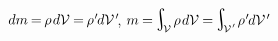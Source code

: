\vspace{-0.5em}\noindent
{}
${dm \hspace{-0.15ex} = \hspace{-0.2ex} \rho \hspace{.2ex} d\mathcal{V} \hspace{-0.1ex} = \hspace{-0.2ex} \rho\hspace{.1ex}' \hspace{-0.2ex} d\mathcal{V}\hspace{.2ex}'\hspace{-0.5ex}}$,
${m \hspace{-0.1ex} = \hspace{-0.2ex} \scalebox{1.4}{$\integral$}_{\hspace{-0.5ex}\raisemath{-0.05em}{\mathcal{V}}} \hspace{.3ex} \rho \hspace{.2ex} d\mathcal{V} \hspace{-0.1ex}
= \hspace{-0.2ex} \scalebox{1.4}{$\integral$}_{\hspace{-0.5ex}\raisemath{-0.05em}{\mathcal{V}\hspace{.12ex}'}} \hspace{.2ex} \rho\hspace{.1ex}' \hspace{-0.2ex} d\mathcal{V}\hspace{.2ex}'\hspace{-0.25ex}}$
%

